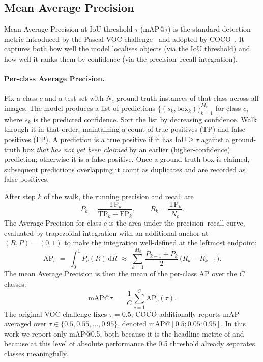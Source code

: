 \subsection{Mean Average Precision}
\label{sec:theory:map}

Mean Average Precision at IoU threshold $\tau$ (mAP@$\tau$) is the standard
detection metric introduced by the Pascal VOC
challenge~\citep{everingham2010pascal} and adopted by
COCO~\citep{lin2014microsoft}. It captures both how well the model localises
objects (via the IoU threshold) and how well it ranks them by confidence
(via the precision--recall integration).

\paragraph{Per-class Average Precision.} Fix a class $c$ and a test set with
$N_c$ ground-truth instances of that class across all images. The model
produces a list of predictions $\{(s_k, \mathrm{box}_k)\}_{k=1}^{M_c}$ for
class $c$, where $s_k$ is the predicted confidence. Sort the list by
decreasing confidence. Walk through it in that order, maintaining a count of
true positives (TP) and false positives (FP). A prediction is a true positive
if it has $\mathrm{IoU} \ge \tau$ against a ground-truth box \emph{that has
not yet been claimed} by an earlier (higher-confidence) prediction; otherwise
it is a false positive. Once a ground-truth box is claimed, subsequent
predictions overlapping it count as duplicates and are recorded as false
positives.

After step $k$ of the walk, the running precision and recall are
\[
  P_k = \frac{\mathrm{TP}_k}{\mathrm{TP}_k + \mathrm{FP}_k}, \qquad
  R_k = \frac{\mathrm{TP}_k}{N_c}.
\]
The Average Precision for class $c$ is the area under the precision--recall
curve, evaluated by trapezoidal integration with an additional anchor at
$(R, P) = (0, 1)$ to make the integration well-defined at the leftmost
endpoint:
\[
  \mathrm{AP}_c \;=\; \int_{0}^{1} P_c(R)\,\mathrm{d}R \;\approx\;
    \sum_{k=1}^{M_c} \frac{P_{k-1} + P_k}{2}\,\bigl(R_k - R_{k-1}\bigr).
\]
The mean Average Precision is then the mean of the per-class AP over the
$C$ classes:
\[
  \mathrm{mAP}@\tau \;=\; \frac{1}{C}\sum_{c=1}^{C} \mathrm{AP}_c(\tau).
\]
The original VOC challenge fixes $\tau = 0.5$; COCO additionally reports
mAP averaged over $\tau \in \{0.5, 0.55, \ldots, 0.95\}$, denoted
mAP@$[0.5\!:\!0.05\!:\!0.95]$. In this work we report only mAP@0.5, both
because it is the headline metric of \citet{redmon2016you} and because at
this level of absolute performance the 0.5 threshold already separates
classes meaningfully.

